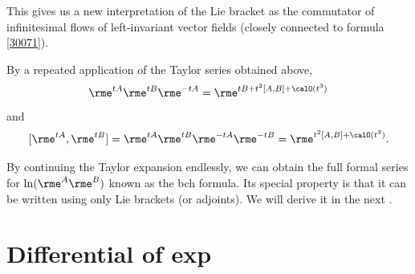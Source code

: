 This gives us a new interpretation of the Lie bracket as the  commutator of infinitesimal flows of left-invariant vector fields (closely connected to formula \eqref{30071}).
\begin{cor}
    By a repeated application of the Taylor series obtained above,
    \[\rme^{tA}\rme^{tB}\rme^{-tA}=\rme^{tB+t^2[A,B]+\calO(t^3)}\]
    and
    \[[\rme^{tA},\rme^{tB}]=\rme^{tA}\rme^{tB}\rme^{-tA}\rme^{-tB}=\rme^{t^2[A,B]+\calO(t^3)}.\]
\end{cor}


\begin{rem}
    By continuing the Taylor expansion endlessly, we can obtain the full formal series for $\ln(\rme^A \rme^B)$ known as the \gls{bch} formula. Its special property is that it can be written using only Lie brackets (or adjoints). We will derive it in the next \sect.
\end{rem}










\section{Differential of exp}

